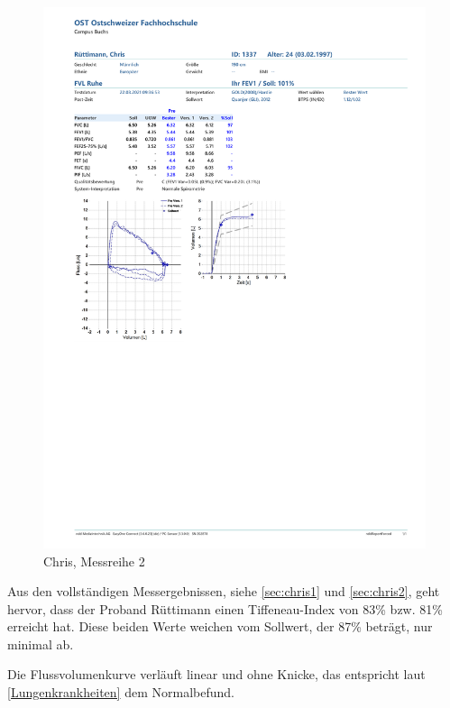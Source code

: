 \documentclass[11pt]{scrartcl}
\begin{document}
    \begin{figure}[H]
        \centering
        \includegraphics[clip, trim=1cm 10cm 0cm 11cm, width=15cm]{Dateien/Chris2.pdf}
        \caption{Chris, Messreihe 2}
    \end{figure}

    Aus den vollständigen Messergebnissen, siehe \autoref{sec:chris1} und \autoref{sec:chris2}, geht hervor, dass der
    Proband Rüttimann einen Tiffeneau-Index von 83\% bzw. 81\% erreicht hat.
    Diese beiden Werte weichen vom Sollwert, der 87\% beträgt, nur minimal ab.

    Die Flussvolumenkurve verläuft linear und ohne Knicke, das entspricht laut \autoref{Lungenkrankheiten} dem
    Normalbefund.
\end{document}
